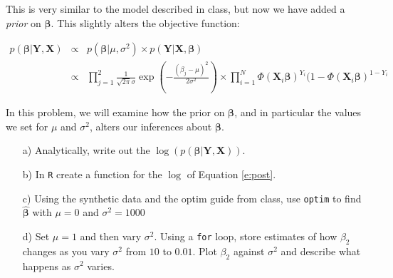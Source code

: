 \documentclass[12pt,letterpaper]{article}
\begin{document}
This is very similar to the model described in class, but now we have added a \emph{prior} on $\boldsymbol{\beta}$.  This slightly alters the objective function:

\begin{eqnarray}
p(\boldsymbol{\beta} | \boldsymbol{Y}, \boldsymbol{X}) & \propto & p(\boldsymbol{\beta}|\mu, \sigma^2) \times p(\boldsymbol{Y}| \boldsymbol{X}, \boldsymbol{\beta}) \label{e:post} \\
& \propto &  \prod_{j=1}^{2} \frac{1}{\sqrt{2\pi} \sigma} \exp\left( - \frac{(\beta_{j} - \mu)^2}{2 \sigma^2} \right) \times \prod_{i=1}^{N} \Phi(\boldsymbol{X}_{i}\boldsymbol{\beta})^{Y_{i} } ( 1- \Phi(\boldsymbol{X}_{i}\boldsymbol{\beta})^{1 - Y_{i} } \nonumber 
\end{eqnarray}

In this problem, we will examine how the prior on $\boldsymbol{\beta}$, and in particular the values we set for $\mu$ and $\sigma^2$, alters our inferences about $\boldsymbol{\beta}$.

\begin{itemize}
\item[a)] Analytically, write out the $\log(p(\boldsymbol{\beta} | \boldsymbol{Y}, \boldsymbol{X}))$.  
\item[b)] In {\tt R} create a function for the $\log$ of Equation \ref{e:post}.
\item[c)] Using the synthetic data and the optim guide from class, use {\tt optim} to find $\widehat{\boldsymbol{\beta}}$ with $\mu = 0$ and $\sigma^2 = 1000$
\item[d)] Set $\mu = 1$ and then vary $\sigma^2$.  Using a {\tt for} loop, store estimates of how $\beta_{2}$ changes as you vary $\sigma^2$ from $10$ to $0.01$.  Plot $\beta_{2}$ against $\sigma^2$ and describe what happens as $\sigma^2$ varies.  
\end{itemize}
\end{document}
